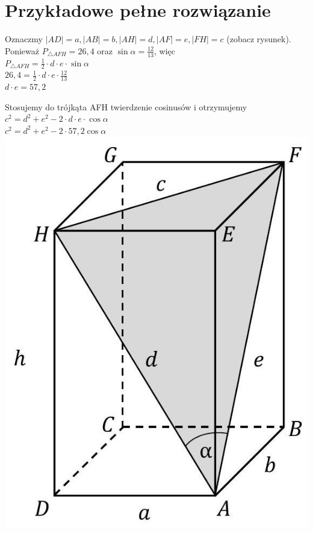 \documentclass[10pt]{article}
\begin{document}
\section*{Przykładowe pełne rozwiązanie}
Oznaczmy $|A D|=a,|A B|=b,|A H|=d,|A F|=e,|F H|=c$ (zobacz rysunek).\\
Ponieważ $P_{\triangle A F H}=26,4$ oraz $\sin \alpha=\frac{12}{13}$, więc\\
$P_{\triangle A F H}=\frac{1}{2} \cdot d \cdot e \cdot \sin \alpha$\\
$26,4=\frac{1}{2} \cdot d \cdot e \cdot \frac{12}{13}$\\
$d \cdot e=57,2$

Stosujemy do trójkąta AFH twierdzenie cosinusów i otrzymujemy\\
$c^{2}=d^{2}+e^{2}-2 \cdot d \cdot e \cdot \cos \alpha$\\
$c^{2}=d^{2}+e^{2}-2 \cdot 57,2 \cos \alpha$\\
\includegraphics[max width=\textwidth, center]{2025_02_07_368c3175bd12651af85ag-29}
\end{document}
